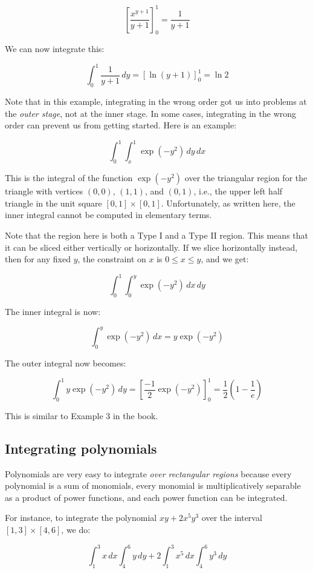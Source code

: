 \documentclass[10pt]{amsart}
\begin{document}
$$\left[\frac{x^{y+1}}{y + 1}\right]_0^1 = \frac{1}{y + 1}$$

We can now integrate this:

$$\int_0^1 \frac{1}{y + 1} \, dy = [\ln(y + 1)]_0^1 = \ln 2$$

Note that in this example, integrating in the wrong order got us into
problems at the {\em outer stage}, not at the inner stage. In some
cases, integrating in the wrong order can prevent us from getting
started. Here is an example:

$$\int_0^1 \int_x^1 \exp(-y^2) \, dy \, dx$$

This is the integral of the function $\exp(-y^2)$ over the triangular
region for the triangle with vertices $(0,0)$, $(1,1)$, and $(0,1)$,
i.e., the upper left half triangle in the unit square $[0,1] \times
[0,1]$. Unfortunately, as written here, the inner integral cannot be
computed in elementary terms.

Note that the region here is both a Type I and a Type II
region. This means that it can be sliced either vertically or
horizontally. If we slice horizontally instead, then for any fixed
$y$, the constraint on $x$ is $0 \le x \le y$, and we get:

$$\int_0^1 \int_0^y \exp(-y^2) \, dx \, dy$$

The inner integral is now:

$$\int_0^y \exp(-y^2) \, dx = y\exp(-y^2)$$

The outer integral now becomes:

$$\int_0^1 y \exp(-y^2) \, dy = \left[\frac{-1}{2}\exp(-y^2)\right]_0^1 = \frac{1}{2}\left(1 - \frac{1}{e}\right)$$

This is similar to Example 3 in the book.

\subsection{Integrating polynomials}

Polynomials are very easy to integrate {\em over rectangular regions}
because every polynomial is a sum of monomials, every monomial is
multiplicatively separable as a product of power functions, and each
power function can be integrated.

For instance, to integrate the polynomial $xy + 2x^5y^3$ over the
interval $[1,3] \times [4,6]$, we do:

$$\int_1^3 x \, dx \int_4^6 y \, dy + 2 \int_1^3 x^5 \, dx \int_4^6 y^3 \, dy$$
\end{document}
